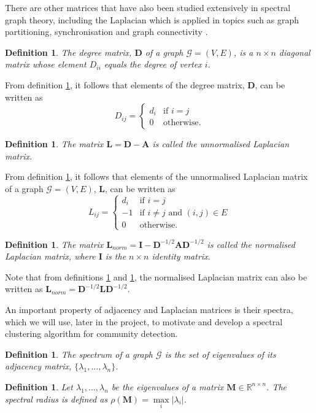 \documentclass[12pt]{article}
\numberwithin{equation}{section}
\newtheorem{definition}[theorem]{Definition}
\newcommand*\matvar[1]{\mathbf#1}
\newcommand*\graphvar[1]{\mathcal#1}
\newcommand*\abs[1]{\left\vert#1\right\vert}
\begin{document}
There are other matrices that have also been studied extensively in spectral graph theory, including the Laplacian which is applied in topics such as graph partitioning, synchronisation and graph connectivity \cite{For10}.
\begin{definition}
\label{def:degreeMatrix}
	The degree matrix, $\matvar{D}$ of a graph $\graphvar{G} = (V,E)$, is a $n \times n$ diagonal matrix whose element $D_{ii}$ equals the degree of vertex $i$.
\end{definition}
From definition \ref{def:degreeMatrix}, it follows that elements of the degree matrix, $\matvar{D}$, can be written as
\begin{equation*}
	 D_{ij} =
	\begin{cases}
		d_{i} & \text{if } i = j\\
		0 & \text{otherwise}.
	\end{cases}
\end{equation*}
\begin{definition}
\label{def:unnormalisedLaplacianMatrix}
	The matrix $\matvar{L} = \matvar{D}  - \matvar{A} $ is called the unnormalised Laplacian matrix.
\end{definition}
From definition \ref{def:unnormalisedLaplacianMatrix}, it follows that elements of the unnormalised Laplacian matrix of a graph $\graphvar{G} = (V,E)$, $\matvar{L}$, can be written as
\begin{equation*}
	L_{ij} =
	\begin{cases}
		d_{i} & \text{if } i = j\\
		-1 & \text{if } i \neq j \text{ and }  (i,j) \in E\\
		0 & \text{otherwise}.
	\end{cases}
\end{equation*}
\begin{definition}
\label{def:normalisedLaplacianMatrix}
	The matrix $\matvar{L_{norm}} = \matvar{I}  - \matvar{D}^{-1/2}\matvar{A}\matvar{D}^{-1/2}$ is called the normalised Laplacian matrix, where $\matvar{I}$ is the $n \times n$ identity matrix.
\end{definition}
Note that from definitions \ref{def:unnormalisedLaplacianMatrix} and \ref{def:normalisedLaplacianMatrix}, the normalised Laplacian matrix can also be written as $\matvar{L_{norm}} = \matvar{D}^{-1/2}\matvar{L}\matvar{D}^{-1/2}$.

An important property of adjacency and Laplacian matrices is their spectra, which we will use, later in the project, to motivate and develop a spectral clustering algorithm for community detection.
\begin{definition}
\label{def:spectrum}
	The spectrum of a graph $\graphvar{G}$ is the set of eigenvalues of its adjacency matrix, $\{\lambda_{1},\dots,\lambda_{n}\}$.
\end{definition}
\begin{definition}
\label{def:spectralRadius}
	Let $\lambda_{1},\dots,\lambda_{n}$ be the eigenvalues of a matrix $\matvar{M} \in \mathbb{R}^{n \times n}$. The spectral radius is defined as $\rho(\matvar{M}) = \max\limits_{i} \abs{\lambda_{i}}$.
\end{definition}
\end{document}
